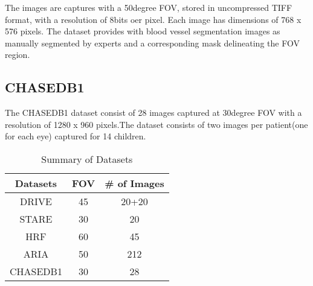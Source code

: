 The images are captures with a 50degree FOV, stored in uncompressed TIFF format, with a resolution of 8bits oer pixel. Each image has dimensions of 768 x 576 pixels. The dataset provides with blood vessel segmentation images as manually segmented by experts and a corresponding mask delineating the FOV region.
\clearpage
\subsection{CHASEDB1}
The CHASEDB1 dataset \cite{fraz2012ensemble} consist of 28 images captured at 30degree FOV with a resolution of 1280 x 960 pixels.The dataset consists of two images per patient(one for each eye) captured for 14 children. 

\begin{table}
	\caption{Summary of Datasets}
	\centering
	\label{table:datasets}
	\begin{tabular}{c c c }
		\toprule
		{Datasets} & {FOV} &{\# of Images}  \\ \hline
		
		DRIVE & 45 & 20+20 \\
		
		STARE& 30 & 20  \\
		
		HRF & 60 & 45  \\
		
		ARIA & 50 & 212 \\
		
		CHASEDB1 & 30 & 28\\
		
		\bottomrule
	\end{tabular}
\end{table}

